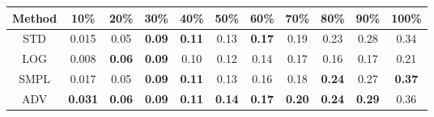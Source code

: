 \documentclass{standalone}
\begin{document}
\begin{tabular}{c|cccccccccc}
      \toprule
      Method & 10\% & 20\% & 30\% & 40\% & 50\% & 60\% & 70\% & 80\% & 90\% & 100\% \\
      \midrule
STD & 0.015 & 0.05 & \textbf{0.09} & \textbf{0.11} & 0.13 & \textbf{0.17} & 0.19 & 0.23 & 0.28 & 0.34\\
LOG & 0.008 & \textbf{0.06} & \textbf{0.09} & 0.10 & 0.12 & 0.14 & 0.17 & 0.16 & 0.17 & 0.21\\
SMPL & 0.017 & 0.05 & \textbf{0.09} & \textbf{0.11} & 0.13 & 0.16 & 0.18 & \textbf{0.24} & 0.27 & \textbf{0.37}\\
ADV & \textbf{0.031} & \textbf{0.06} & \textbf{0.09} & \textbf{0.11} & \textbf{0.14} & \textbf{0.17} & \textbf{0.20} & \textbf{0.24} & \textbf{0.29} & 0.36\\
  \bottomrule
\end{tabular}
\end{document}
